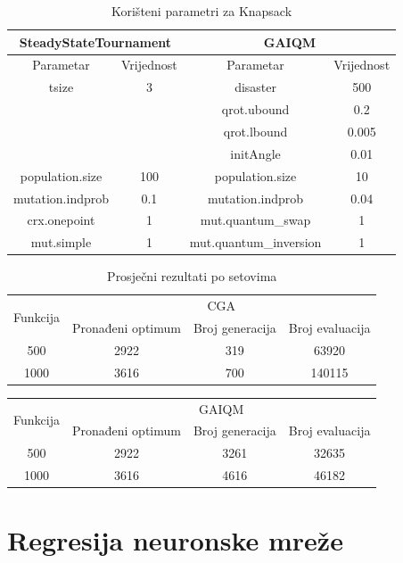\documentclass[times, utf8, zavrsni, numeric]{fer}
\begin{document}
\begin{table}[htb]
\caption{Korišteni parametri za Knapsack}
\centering
\begin{tabular}{|c|c||c|c|} \hline
\multicolumn{2}{|c||}{SteadyStateTournament} & \multicolumn{2}{c|}{GAIQM} \\ 
\hline
Parametar & Vrijednost & Parametar & Vrijednost \\ 
\hline
tsize & 3 & disaster & 500 \\
&& qrot.ubound & 0.2 \\
&& qrot.lbound & 0.005 \\
&& initAngle & 0.01 \\
population.size & 100 & population.size & 10 \\
mutation.indprob & 0.1 & mutation.indprob & 0.04 \\
crx.onepoint & 1 & mut.quantum\_swap & 1 \\
mut.simple & 1 & mut.quantum\_inversion & 1 \\
\hline
\end{tabular}
\end{table}

\begin{table}[htb]
\caption{Prosječni rezultati po setovima}
\centering
\begin{tabular}{|c|ccc|} \hline
\multirow{2}{*}{Funkcija} & \multicolumn{3}{c|}{CGA} \\ \cline{2-4}
 & Pronađeni optimum & Broj generacija & Broj evaluacija \\ 
\hline
500 & 2922 & 319 & 63920 \\
1000 & 3616 & 700 & 140115 \\
\hline
\end{tabular}
\end{table}
\begin{table}[htb]
\centering
\begin{tabular}{|c|ccc|} \hline
\multirow{2}{*}{Funkcija} & \multicolumn{3}{c|}{GAIQM} \\ \cline{2-4}
 & Pronađeni optimum & Broj generacija & Broj evaluacija \\ 
\hline
500 & 2922 & 3261 & 32635 \\
1000 & 3616 & 4616 & 46182 \\
\hline
\end{tabular}
\end{table}

\section{Regresija neuronske mreže}
\end{document}
